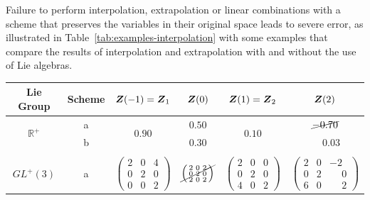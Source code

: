 \documentclass[12pt]{article}
\newcommand{\mbb}[1]{\mathbb{#1}}
\begin{document}
Failure to perform interpolation, extrapolation or linear combinations with a
scheme that preserves the variables in their original space leads to severe
error, as illustrated in Table~\ref{tab:examples-interpolation} with some
examples that compare the results of interpolation and extrapolation with and
without the use of Lie algebras.

\begin{table}[htbp]
  \begin{center}
    \begin{tabular}{ c c c c c c}
      \toprule
      Lie Group
      &
      Scheme
      &
      ${\boldsymbol{Z}}(-1) = {\boldsymbol{Z}}_1$
      &
      ${\boldsymbol{Z}}(0)$
      &
      ${\boldsymbol{Z}}(1) = {\boldsymbol{Z}}_2$
      &
      ${\boldsymbol{Z}}(2)$
      \\
      \hline
      \multirow{2}{*}{$\mbb{R}^+$}
      &
      a
      &
      \multirow{2}{*}{$0.90$}
      &
      $0.50$
      &
      \multirow{2}{*}{$0.10$}
      &
      $\cancel{-0.70}$
      \\
      
      &
      b
      &
      
      &
      $0.30$
      &
      
      &
      $\phantom{-}0.03$
      \\
      \\
      \multirow{4}{*}{$GL^+(3)$}
      &
      \multirow{2}{*}{a}
      &
      \multirow{4}{*}{
        $\left(
          \begin{smallmatrix}
            2 & 0 & 4\\
            0 & 2 & 0\\
            0 & 0 & 2
          \end{smallmatrix}
        \right)$}
      &
      \multirow{2}{*}{
        $\cancel{\left(
          \begin{smallmatrix}
            2 & 0 & 2\\
            0 & 2 & 0\\
            2 & 0 & 2
          \end{smallmatrix}
        \right)}$}
      &
      \multirow{4}{*}{
        $\left(
          \begin{smallmatrix}
            2 & 0 & 0\\
            0 & 2 & 0\\
            4 & 0 & 2
          \end{smallmatrix}
        \right)$}
      &
      \multirow{2}{*}{
        $\left(
          \begin{smallmatrix}
            2 & 0 & -2\\
            0 & 2 & \phantom{-}0\\
            6 & 0 & \phantom{-}2
          \end{smallmatrix}
        \right)$}
      \\
      \\


\end{tabular}
\end{center}
\end{table}
\end{document}

